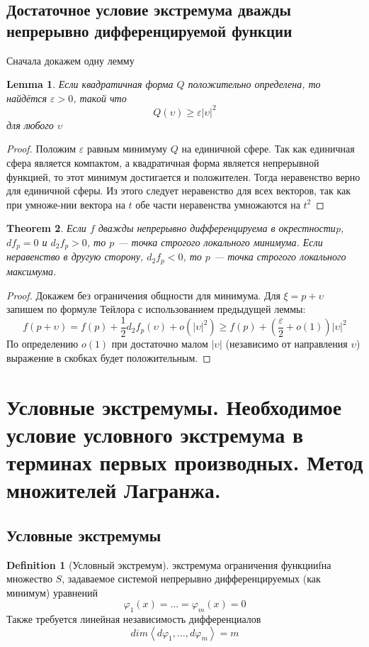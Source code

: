 \documentclass[a4paper,12pt]{article} %
\newtheorem{theorem}{Theorem}
\newtheorem{lemma}[theorem]{Lemma}
\theoremstyle{definition}
\newtheorem{definition}{Definition}[section]
\begin{document}
\subsection{Достаточное условие экстремума дважды непрерывно дифференцируемой функции}
Сначала докажем одну лемму
\begin{lemma}
	Если квадратичная форма $Q$ положительно определена, то найдётся $\varepsilon > 0$, такой что
	\begin{equation}
		Q(\upsilon) \geq \varepsilon |\upsilon|^2
	\end{equation}
	для любого $\upsilon$
\end{lemma}
\begin{proof}
	Положим $\varepsilon$ равным минимуму $Q$ на единичной сфере. Так как единичная сфера является компактом, а квадратичная форма является непрерывной функцией, то этот минимум достигается и положителен. Тогда неравенство верно для единичной сферы. Из этого следует неравенство для всех векторов, так как при умноже-нии вектора на $t$ обе части неравенства умножаются на $t^2$
\end{proof}
\begin{theorem}
	Если $f$ дважды непрерывно дифференцируема в окрестностиp, $d f_p = 0$ и $d_2 f_p > 0$, то $p$ ---  точка строгого локального минимума. Если неравенство в другую сторону, $d_2 f_p < 0$,  то $p$ --- точка строгого локального максимума.
\end{theorem}
\begin{proof}
	Докажем без ограничения общности для минимума. Для $\xi = p + \upsilon$ запишем по формуле Тейлора с использованием предыдущей леммы:
	\begin{equation}
		f(p+\upsilon) = f(p) + \frac{1}{2} d_2 f_p(\upsilon) + o(|\upsilon|^2) \geq f(p) + \left( \frac{\varepsilon}{2} + o(1) \right) |\upsilon|^2
	\end{equation}
	По определению $o(1)$ при достаточно малом $|\upsilon|$ (независимо от направления $\upsilon$) выражение в скобках будет положительным.
\end{proof}
\section{Условные экстремумы. Необходимое условие условного экстремума в терминах первых производных. Метод множителей Лагранжа.}
\subsection{Условные экстремумы}
\begin{definition}[Условный экстремум]
	экстремума ограничения функцииfна множество $S$, задаваемое системой непрерывно дифференцируемых (как минимум) уравнений
	$$\varphi_1(x) = \dots = \varphi_m(x) = 0$$
	Также требуется линейная независимость дифференциалов
	$$dim \left< d \varphi_1, \dots, d \varphi_m \right> = m$$
\end{definition}
\end{document}
